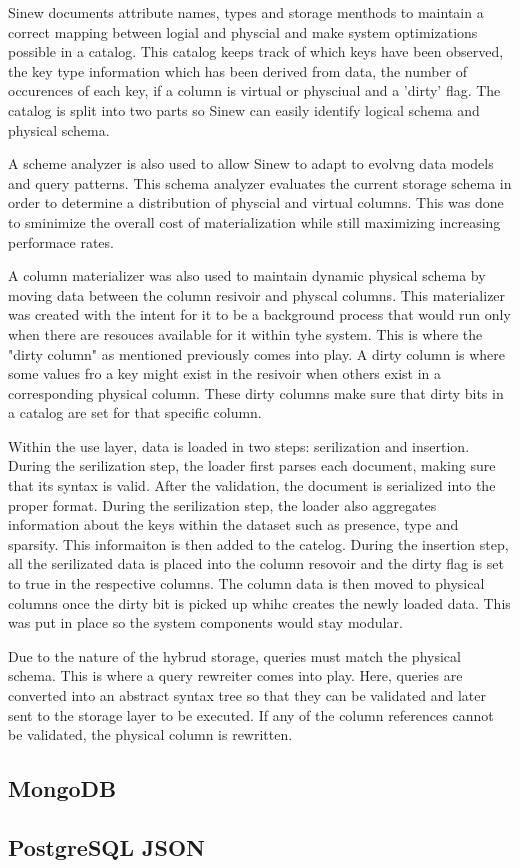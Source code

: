 \documentclass[sigconf]{acmart}
\begin{document}
    Sinew documents attribute names, types and storage menthods to maintain a correct mapping between logial and physcial and make system optimizations possible in a catalog. This catalog keeps track of which keys have been observed, the key type information which has been derived from data, the number of occurences of each key, if a column is virtual or physciual and a 'dirty' flag. The catalog is split into two parts so Sinew can easily identify logical schema and physical schema. 

    A scheme analyzer is also used to allow Sinew to adapt to evolvng data models and query patterns. This schema analyzer evaluates the current storage schema in order to determine a distribution of physcial and virtual columns. This was done to sminimize the overall cost of materialization while still maximizing increasing performace rates. 

    A column materializer was also used to maintain dynamic physical schema by moving data between the column resivoir and physcal columns. This materializer was created with the intent for it to be a background process that would run only when there are resouces available for it within tyhe system. This is where the "dirty column" as mentioned previously comes into play. A dirty column is where some values fro a key might exist in the resivoir when others exist in a corresponding physical column. These dirty columns make sure that dirty bits in a catalog are set for that specific column. 

    Within the use layer, data is loaded in two steps: serilization and insertion. During the serilization step, the loader first parses each document, making sure that its syntax is valid. After the validation, the document is serialized into the proper format. During the serilization step, the loader also aggregates information about the keys within the dataset such as presence, type and sparsity. This informaiton is then added to the catelog. During the insertion step, all the serilizated data is placed into the column resovoir and the dirty flag is set to true in the respective columns. The column data is then moved to physical columns once the dirty bit is picked up whihc creates the newly loaded data. This was put in place so the system components would stay modular. 

    Due to the nature of the hybrud storage, queries must match the physical schema. This is where a query rewreiter comes into play. Here, queries are converted into an abstract syntax tree so that they can be validated and later sent to the storage layer to be executed. If any of the column references cannot be validated, the physical column is rewritten. 


    \subsection{MongoDB}


    \subsection{PostgreSQL JSON}
    
    



\end{document}
